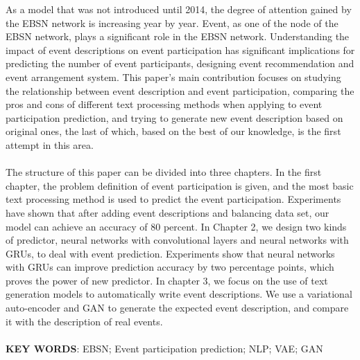 \begin{myparindent}{0pt}
As a model that was not introduced until 2014, the degree of attention gained by the EBSN network is increasing year by year. Event, as one of the node of the EBSN network, plays a significant role in the EBSN network. Understanding the impact of event descriptions on event participation has significant implications for predicting the number of event participants, designing event recommendation and event arrangement system. This paper's main contribution focuses on studying the relationship between event description and event participation, comparing the pros and cons of different text processing methods when applying to event participation prediction, and trying to generate new event description based on original ones, the last of which, based on the best of our knowledge, is the first attempt in this area.
\\
\\
The structure of this paper can be divided into three chapters. In the first chapter, the problem definition of event participation is given, and the most basic text processing method is used to predict the event participation. Experiments have shown that after adding event descriptions and balancing data set, our model can achieve an accuracy of 80 percent. In Chapter 2, we design two kinds of predictor, neural networks with convolutional layers and neural networks with GRUs, to deal with event prediction. Experiments show that neural networks with GRUs can improve prediction accuracy by two percentage points, which proves the power of new predictor. In chapter 3, we focus on the use of text generation models to automatically write event descriptions. We use a variational auto-encoder and GAN to generate the expected event description, and compare it with the description of real events.
\\
\\
\textbf{KEY WORDS}: EBSN; Event participation prediction; NLP; VAE; GAN 
\end{myparindent}
% 